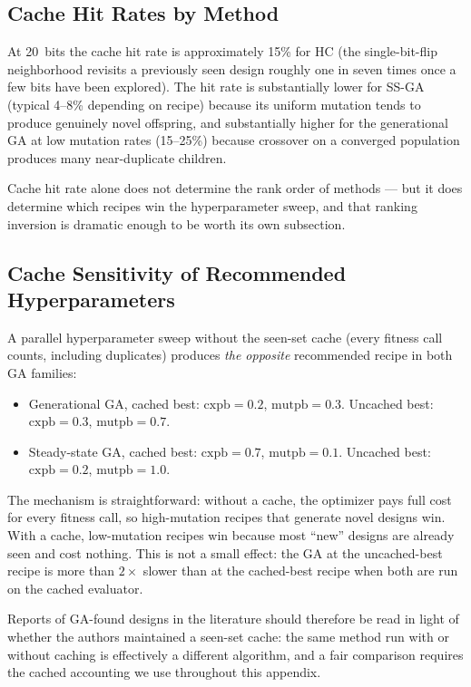 \subsection{Cache Hit Rates by Method}

At 20~bits the cache hit rate is approximately 15\% for HC (the
single-bit-flip neighborhood revisits a previously seen design
roughly one in seven times once a few bits have been explored).
The hit rate is substantially lower for SS-GA (typical 4--8\%
depending on recipe) because its uniform mutation tends to produce
genuinely novel offspring, and substantially higher for the
generational GA at low mutation rates (15--25\%) because crossover
on a converged population produces many near-duplicate children.

Cache hit rate alone does not determine the rank order of
methods --- but it does determine which recipes win the
hyperparameter sweep, and that ranking inversion is dramatic
enough to be worth its own subsection.

\subsection{Cache Sensitivity of Recommended Hyperparameters}

A parallel hyperparameter sweep without the seen-set cache (every
fitness call counts, including duplicates) produces \emph{the
opposite} recommended recipe in both GA families:
\begin{itemize}
\item Generational GA, cached best: $\mathrm{cxpb} = 0.2$,
      $\mathrm{mutpb} = 0.3$. Uncached best:
      $\mathrm{cxpb} = 0.3$, $\mathrm{mutpb} = 0.7$.
\item Steady-state GA, cached best: $\mathrm{cxpb} = 0.7$,
      $\mathrm{mutpb} = 0.1$. Uncached best:
      $\mathrm{cxpb} = 0.2$, $\mathrm{mutpb} = 1.0$.
\end{itemize}
The mechanism is straightforward: without a cache, the optimizer
pays full cost for every fitness call, so high-mutation recipes
that generate novel designs win. With a cache, low-mutation
recipes win because most ``new'' designs are already seen and cost
nothing. This is not a small effect: the GA at the uncached-best
recipe is more than $2\times$ slower than at the cached-best recipe
when both are run on the cached evaluator.

Reports of GA-found designs in the literature should therefore be
read in light of whether the authors maintained a seen-set cache:
the same method run with or without caching is effectively a
different algorithm, and a fair comparison requires the cached
accounting we use throughout this appendix.


